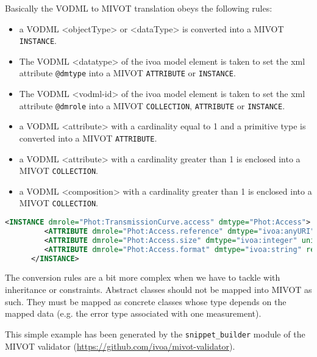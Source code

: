 Basically the VODML to MIVOT translation obeys the following rules:
\begin{itemize}
    \item a VODML <objectType> or <dataType> is converted into a MIVOT \texttt{INSTANCE}. 
    \item The VODML <datatype> of the ivoa model element is taken to set the xml attribute \texttt{@dmtype} into a MIVOT \texttt{ATTRIBUTE} or \texttt{INSTANCE}. 
    \item The VODML <vodml-id> of the ivoa model element is taken to set the xml attribute \texttt{@dmrole} into a MIVOT  \texttt{COLLECTION}, \texttt{ATTRIBUTE} or \texttt{INSTANCE}. 
    \item a VODML <attribute> with a cardinality equal to 1 and a primitive type 
          is converted into a MIVOT \texttt{ATTRIBUTE}. 
    \item a VODML <attribute> with a cardinality greater than 1 is enclosed into a MIVOT \texttt{COLLECTION}. 
    \item a VODML <composition> with a cardinality greater than 1 is enclosed into a MIVOT \texttt{COLLECTION}.     
\end{itemize} 

\begin{lstlisting}[caption={MIVOT instanciation of the PhotDM class \texttt{Access}. 
VODML attributes are mapped as simple \texttt{ATTRIBUTE}s since their cardinality is equal to 
1 and they have primitive types. In this example, automatically 
generated, \texttt{ATTRIBUTE}s come with both \texttt{@ref} and \texttt{@value}. Using one, the other or both 
depends on the actual data being annotated (see \ref{ATTRIBUTE}). 
The cryptic  "@@@@@" label is a tag used by the annoter tool to indicate a place holder for column reference. It must be replaced with the actual name of the table column (reference to a \texttt{FIELD} id or name, actually) to be used to set the \texttt{ATTRIBUTE} values.
},language=XML]
      <INSTANCE dmrole="Phot:TransmissionCurve.access" dmtype="Phot:Access">
         <ATTRIBUTE dmrole="Phot:Access.reference" dmtype="ivoa:anyURI" ref="@@@@@" value=""/>
         <ATTRIBUTE dmrole="Phot:Access.size" dmtype="ivoa:integer" unit="" ref="@@@@@" value=""/>
         <ATTRIBUTE dmrole="Phot:Access.format" dmtype="ivoa:string" ref="@@@@@" value=""/>
      </INSTANCE>
\end{lstlisting}  

The conversion rules are a bit more complex when we have to tackle with inheritance or constraints.
Abstract classes should not be mapped into MIVOT as such. They must be mapped as concrete classes 
whose type depends on the mapped data (e.g. the error type associated with one measurement).

This simple example has been generated by the \texttt{snippet\_builder} module of the MIVOT validator 
(\url{https://github.com/ivoa/mivot-validator}).

